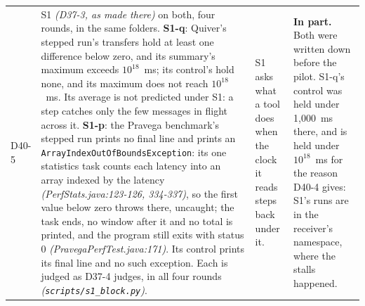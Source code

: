 \documentclass[11pt]{article}
\newcommand{\gl}[1]{{\color{soft}\itshape\small (#1)}}
\begin{document}
{\begin{longtable}{@{}p{1.1cm} >{\raggedright\arraybackslash}p{6.1cm} >{\raggedright\arraybackslash}p{6.0cm} >{\raggedright\arraybackslash}p{2.2cm}@{}}
D40-5 & S1 \gl{D37-3, as made there} on both, four rounds, in the same folders. \textbf{S1-q}: Quiver's stepped run's transfers hold at least one difference below zero, and its summary's maximum exceeds $10^{18}$~ms; its control's hold none, and its maximum does not reach $10^{18}$~ms. Its average is not predicted under S1: a step catches only the few messages in flight across it. \textbf{S1-p}: the Pravega benchmark's stepped run prints no final line and prints an \texttt{ArrayIndexOutOfBoundsException}: its one statistics task counts each latency into an array indexed by the latency \gl{PerfStats.java:123-126, 334-337}, so the first value below zero throws there, uncaught; the task ends, no window after it and no total is printed, and the program still exits with status 0 \gl{PravegaPerfTest.java:171}. Its control prints its final line and no such exception. Each is judged as D37-4 judges, in all four rounds \gl{\texttt{scripts/s1\_block.py}}. & S1 asks what a tool does when the clock it reads steps back under it. & \textbf{In part.} Both were written down before the pilot. S1-q's control was held under 1,000~ms there, and is held under $10^{18}$~ms for the reason D40-4 gives: S1's runs are in the receiver's namespace, where the stalls happened. \\

\end{longtable}}
\end{document}
